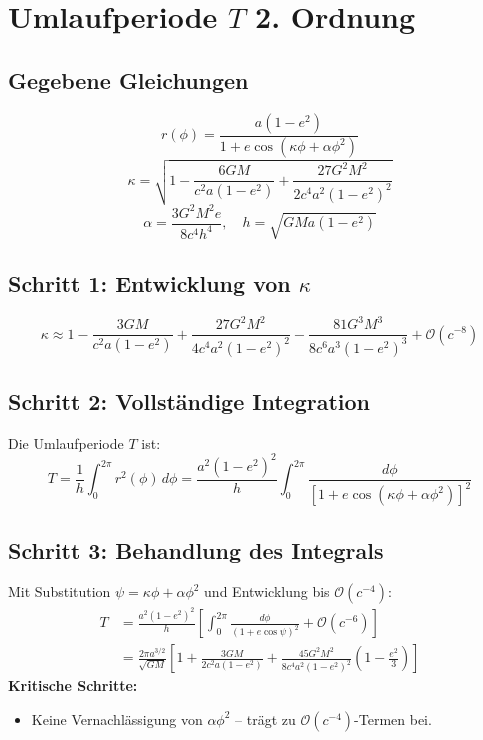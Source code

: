 \newpage
\section{Umlaufperiode \( T \) 2. Ordnung}

\subsection*{Gegebene Gleichungen}
\begin{equation}
r(\phi) = \frac{a(1-e^2)}{1 + e\cos\left(\kappa\phi + \alpha\phi^2\right)} \label{eq:orbit}
\end{equation}
\begin{equation}
\kappa = \sqrt{1 - \frac{6GM}{c^2a(1-e^2)} + \frac{27G^2M^2}{2c^4a^2(1-e^2)^2}} \label{eq:kappa}
\end{equation}
\begin{equation}
\alpha = \frac{3G^2M^2e}{8c^4h^4}, \quad h = \sqrt{GMa(1-e^2)} \label{eq:alpha}
\end{equation}

\subsection*{Schritt 1: Entwicklung von \(\kappa\)}
\begin{equation}
\kappa \approx 1 - \frac{3GM}{c^2a(1-e^2)} + \frac{27G^2M^2}{4c^4a^2(1-e^2)^2} - \frac{81G^3M^3}{8c^6a^3(1-e^2)^3} + \mathcal{O}(c^{-8}) 
\end{equation}

\subsection*{Schritt 2: Vollständige Integration}
Die Umlaufperiode \( T \) ist:
\begin{equation}
T = \frac{1}{h} \int_0^{2\pi} r^2(\phi) \, d\phi = \frac{a^2(1-e^2)^2}{h} \int_0^{2\pi} \frac{d\phi}{\left[1 + e\cos\left(\kappa\phi + \alpha\phi^2\right)\right]^2} \label{eq:T_integral}
\end{equation}

\subsection*{Schritt 3: Behandlung des Integrals}
Mit Substitution \(\psi = \kappa\phi + \alpha\phi^2\) und Entwicklung bis \(\mathcal{O}(c^{-4})\):
\begin{align}
T &= \frac{a^2(1-e^2)^2}{h} \left[ \int_0^{2\pi} \frac{d\phi}{(1 + e\cos\psi)^2} + \mathcal{O}(c^{-6}) \right] \\
  &= \frac{2\pi a^{3/2}}{\sqrt{GM}} \left[1 + \frac{3GM}{2c^2a(1-e^2)} + \frac{45G^2M^2}{8c^4a^2(1-e^2)^2}\left(1 - \frac{e^2}{3}\right)\right] \label{eq:T_final}
\end{align}
\textbf{Kritische Schritte:}
\begin{itemize}
\item Keine Vernachlässigung von \(\alpha\phi^2\) – trägt zu \(\mathcal{O}(c^{-4})\)-Termen bei.
\end{itemize}
